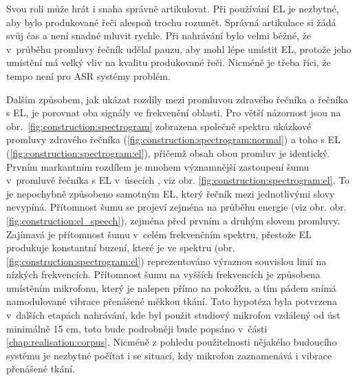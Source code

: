 
Svou roli může hrát i snaha správně artikulovat.
Při používání EL je nezbytné, aby bylo produkované řeči alespoň trochu rozumět.
Správná artikulace si žádá svůj čas a není snadné mluvit rychle.
Při nahrávání bylo velmi běžné, že v~průběhu promluvy řečník udělal pauzu, aby mohl lépe umístit EL, protože jeho umístění má velký vliv na kvalitu produkované řeči.
Nicméně je třeba říci, že tempo není pro ASR systémy problém.

Dalším způsobem, jak ukázat rozdíly mezi promluvou zdravého řečníka a řečníka s EL, je porovnat oba signály ve frekvenční oblasti.
Pro větší názornost jsou na obr.~\ref{fig:construction:spectrogram} zobrazena společně spektra ukázkové promluvy zdravého řečníka (\ref{fig:construction:spectrogram:normal}) a toho s EL (\ref{fig:construction:spectrogram:el}), přičemž obsah obou promluv je identický.
Prvním markantním rozdílem je mnohem významnější zastoupení šumu v~promluvě řečníka s EL v~úsecích , viz obr. \ref{fig:construction:spectrogram:el}.
To je nepochybně způsobeno samotným EL, který řečník mezi jednotlivými slovy nevypíná.
Přítomnost šumu se projeví zejména na průběhu energie (viz obr. obr. \ref{fig:construction:el_speech}), zejména před prvním a druhým slovem promluvy.
Zajímavá je přítomnost šumu v~celém frekvenčním spektru, přestože EL produkuje konstantní buzení, které je ve spektru (obr. \ref{fig:construction:spectrogram:el}) reprezentováno výraznou souvislou linií na nízkých frekvencích.
Přítomnost šumu na vyšších frekvencích je způsobena umístěním mikrofonu, který je nalepen přímo na pokožku, a tím pádem snímá namodulované vibrace přenášené měkkou tkání.
Tato hypotéza byla potvrzena v~dalších etapách nahrávání, kde byl použit studiový mikrofon vzdálený od úst minimálně 15 cm, toto bude podrobněji bude popsáno v~části \ref{chap:realisation:corpus}.
Nicméně z pohledu použitelnosti nějakého budoucího systému je nezbytné počítat i se situací, kdy mikrofon zaznamenává i vibrace přenášené tkání.

